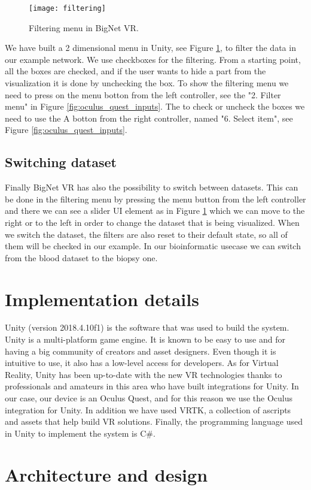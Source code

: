 \begin{figure}[h!]
    \centering%
    \texttt{[image: filtering]}
    \caption{Filtering menu in BigNet VR.}
    \label{fig:filtering}
\end{figure}%


We have built a 2 dimensional menu in Unity, see Figure \ref{fig:filtering}, to filter the data in our example network. We use checkboxes for the filtering. From a starting point, all the boxes are checked, and if the user wants to hide a part from the visualization it is done by unchecking the box. To show the filtering menu we need to press on the menu botton from the left controller, see the "2. Filter menu" in Figure \ref{fig:oculus_quest_inputs}. The to check or uncheck the boxes we need to use the A botton from the right controller, named "6. Select item", see Figure \ref{fig:oculus_quest_inputs}.

\subsection{Switching dataset}
Finally BigNet VR has also the possibility to switch between datasets. This can be done in the filtering menu by pressing the menu button from the left controller and there we can see a slider UI element as in Figure \ref{fig:filtering} which we can move to the right or to the left in order to change the dataset that is being visualized. When we switch the dataset, the filters are also reset to their default state, so all of them will be checked in our example. In our bioinformatic usecase we can switch from the blood dataset to the biopsy one.

\section{Implementation details}
Unity (version 2018.4.10f1\cite{unity2018}) is the software that was used to build the system. Unity is a multi-platform game engine. It is known to be easy to use and for having a big community of creators and asset designers\cite{developing_vr_unity}. Even though it is intuitive to use, it also has a low-level access for developers. As for Virtual Reality, Unity has been up-to-date with the new VR technologies thanks to professionals and amateurs in this area who have built integrations for Unity. In our case, our device is an Oculus Quest, and for this reason we use the Oculus integration for Unity\cite{oculus_unity_integration}. In addition we have used VRTK, a collection of ascripts and assets that help build VR solutions\cite{vrtk_what}. Finally, the programming language used in Unity to implement the system is C\#.

\section{Architecture and design}
